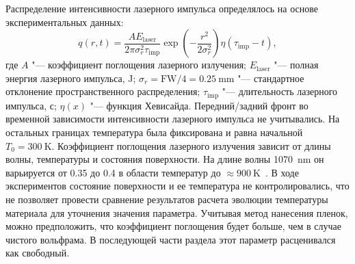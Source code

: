 Распределение интенсивности лазерного импульса определялось на основе экспериментальных данных:
\begin{equation}
    q(r,t)=\frac{A E_\mathrm{laser}}{2\pi \sigma_{r}^2\tau_\mathrm{imp}} \exp \left( -\frac{r^2}{2 \sigma_r^2} \right) \eta \left( \tau_\mathrm{imp}-t \right),
\end{equation}
где \(A \) "--- коэффициент поглощения лазерного излучения; $E_\mathrm{laser}$ "--- полная энергия лазерного импульса, \si{\joule}; $\sigma_r=\mathrm{FW}/4=\SI{0.25}{\milli\meter}$ "--- стандартное отклонение пространственного распределения; \( \tau_\mathrm{imp} \) "--- длительность лазерного импульса, с; \(\eta(x)\) "--- функция Хевисайда. Передний/задний фронт во временной зависимости интенсивности лазерного импульса не учитывались. На остальных границах температура была фиксирована и равна начальной \(T_0=\SI{300}{\kelvin}\). Коэффициент поглощения лазерного излучения зависит от длины волны, температуры и состояния поверхности. На длине волны \SI{1070}{\nano\meter} он варьируется от \num{0.35} до \num{0.4} в области температур до \( \approx \SI{900}{\kelvin} \)~\cite{Minissale2017}. В ходе экспериментов состояние поверхности и ее температура не контролировались, что не позволяет провести сравнение результатов расчета эволюции температуры материала для уточнения значения параметра. Учитывая метод нанесения пленок, можно предположить, что коэффициент поглощения будет больше, чем в случае чистого вольфрама. В последующей части раздела этот параметр расценивался как свободный.

